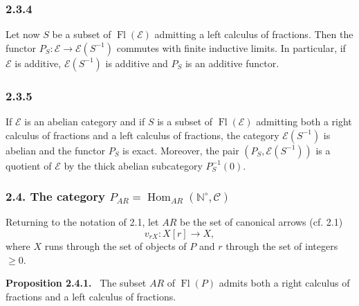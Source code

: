 \documentclass[11pt]{article}
\providecommand{\NN}{\mathbb{N}}
\newenvironment{statement}[1]{\par\medskip\noindent\textbf{#1.}\ }{\par\medskip}
\DeclareMathOperator{\Hom}{Hom}
\providecommand{\Hom}{\operatorname{Hom}}
\providecommand{\Fl}{\operatorname{Fl}}
\providecommand{\NN}{\mathbb N}
\providecommand{\cC}{\mathcal C}
\providecommand{\cE}{\mathcal E}
\providecommand{\cC}{\mathcal C}
\providecommand{\Hom}{\operatorname{Hom}}
\begin{document}
\subsubsection*{2.3.4}
Let now $S$ be a subset of $\Fl(\cE)$ admitting a left calculus of fractions. Then the functor $P_S:\cE\to\cE(S^{-1})$ commutes with finite inductive limits. In particular, if $\cE$ is additive, $\cE(S^{-1})$ is additive and $P_S$ is an additive functor.

\subsubsection*{2.3.5}
If $\cE$ is an abelian category and if $S$ is a subset of $\Fl(\cE)$ admitting both a right calculus of fractions and a left calculus of fractions, the category $\cE(S^{-1})$ is abelian and the functor $P_S$ is exact. Moreover, the pair $(P_S,\cE(S^{-1}))$ is a quotient of $\cE$ by the thick abelian subcategory $P_S^{-1}(0)$.

\subsubsection*{2.4. The category $P_{AR}=\Hom_{AR}(\NN^\circ,\cC)$}
Returning to the notation of 2.1, let $AR$ be the set of canonical arrows (cf. 2.1)
\[
v_{rX}:X[r]\longrightarrow X,
\]
where $X$ runs through the set of objects of $P$ and $r$ through the set of integers $\ge0$.

\begin{statement}{Proposition 2.4.1}
The subset $AR$ of $\Fl(P)$ admits both a right calculus of fractions and a left calculus of fractions.
\end{statement}
\end{document}
